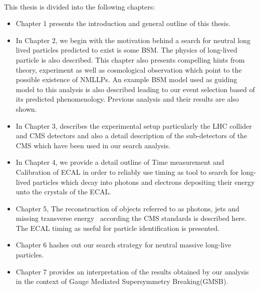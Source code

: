 \paragraph*{}
This thesis is divided into the following chapters:
\begin{itemize}
\item Chapter 1 presents the introduction and general outline of this thesis. 

\item In Chapter 2, we begin with the motivation behind a search for neutral long lived particles predicted to exist is some BSM.
The physics of long-lived particle is also described.
This chapter also presents compelling  hints from theory, experiment as well as cosmological observation which point to the possible existence of NMLLPs.
An example BSM model used as guiding model to this analysis is also described leading to our event selection based of its predicted phenomenology. 
Previous analysis and their results are also shown. 

\item  In Chapter 3,  describes the experimental setup particularly the LHC collider and CMS detectors and also a
detail description of the sub-detectors of the CMS which have been used in our search analysis.

\item In Chapter 4, we provide a detail outline of Time measurement and Calibration of ECAL in order to 
reliably use timing as tool to search for long-lived particles which decay into photons and electrons depositing their energy unto the crystals of the ECAL.
\item Chapter 5,
The reconstruction of objects referred to as photons, jets and missing transverse energy ~\MET according the CMS standards is described here. The ECAL timing as useful for particle identification is presented.

\item Chapter 6  hashes out our search strategy for neutral massive long-live particles. 

\item Chapter 7 provides an interpretation of the results obtained by our analysis  in the context of Gauge Mediated Supersymmetry Breaking(GMSB).


\end{itemize}
